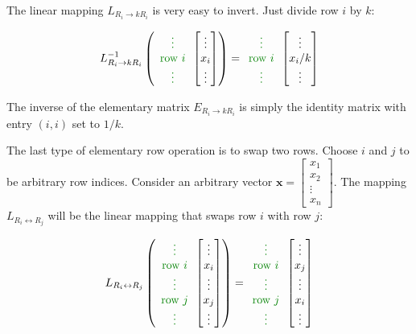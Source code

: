 \documentclass{article}
\newcommand{\dg}[1]{\textcolor{dark_green}{#1}}
\begin{document}
The linear mapping \(L_{R_i \rightarrow kR_i}\) is very easy to invert. Just divide row \(i\) by \(k\): 

\[L_{R_i \rightarrow kR_i}^{-1}\left(\dg{\begin{array}{c} \vdots \\ \text{row \(i\)} \\ \vdots \end{array}}\begin{bmatrix} \vdots \\ x_i \\ \vdots \end{bmatrix}\right) = \dg{\begin{array}{c} \vdots \\ \text{row \(i\)} \\ \vdots \end{array}}\begin{bmatrix} \vdots \\ x_i/k \\ \vdots \end{bmatrix}\]

The inverse of the elementary matrix \(E_{R_i \rightarrow kR_i}\) is simply the identity matrix with entry \((i, i)\) set to \(1/k\).

\vspace{1cm}

The last type of elementary row operation is to swap two rows. Choose \(i\) and \(j\) to be arbitrary row indices. Consider an arbitrary vector \(\mathbf{x} = \begin{bmatrix} x_1 \\ x_2 \\ \vdots \\ x_n \end{bmatrix}\). The mapping \(L_{R_i \leftrightarrow R_j}\) will be the linear mapping that swaps row \(i\) with row \(j\):

\[L_{R_i \leftrightarrow R_j}\left(\dg{\begin{array}{c} \vdots \\ \text{row \(i\)} \\ \vdots \\ \text{row \(j\)} \\ \vdots \end{array}}\begin{bmatrix} \vdots \\ x_i \\ \vdots \\ x_j \\ \vdots \end{bmatrix}\right) = \dg{\begin{array}{c} \vdots \\ \text{row \(i\)} \\ \vdots \\ \text{row \(j\)} \\ \vdots \end{array}}\begin{bmatrix} \vdots \\ x_j \\ \vdots \\ x_i \\ \vdots \end{bmatrix}\]
\end{document}
